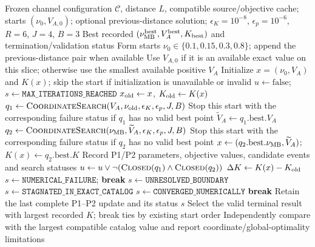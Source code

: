 \begin{algorithm}[t]
\caption{Exact-source alternating optimization with explicit search status}
\label{alg:ao}
\small
\begin{algorithmic}[1]
\Require Frozen channel configuration $\mathcal C$, distance $L$, compatible
source/objective cache; starts $(\nu_0,V_{A,0})$; optional previous-distance
solution; $\epsilon_K=10^{-8}$, $\epsilon_p=10^{-6}$,
$R=6$, $J=4$, $B=3$
\Ensure Best recorded $(\nu_{\rm MB}^{\rm best},V_A^{\rm best},K_{\rm best})$
and termination/validation status
\State Form starts $\nu_0\in\{0.1,0.15,0.3,0.8\}$; append the previous-distance pair when available
  \State Use $V_{A,0}$ if it is an available exact value on this slice; otherwise use the smallest available positive $V_A$
  \State Initialize $x=(\nu_0,V_A)$ and $K(x)$; skip the start if initialization is unavailable or invalid
  \State $u\gets\mathrm{false}$; $s\gets\texttt{MAX\_ITERATIONS\_REACHED}$
    \State $x_{\rm old}\gets x$, $K_{\rm old}\gets K(x)$
    \State $q_1\gets\Call{CoordinateSearch}{V_A,\nu_{\rm old},\epsilon_K,\epsilon_p,J,B}$
    \State Stop this start with the corresponding failure status if $q_1$ has no valid best point
    \State $\widetilde V_A\gets q_1.\mathrm{best}.V_A$ 
    \State $q_2\gets\Call{CoordinateSearch}{\nu_{\rm MB},\widetilde V_A,\epsilon_K,\epsilon_p,J,B}$
    \State Stop this start with the corresponding failure status if $q_2$ has no valid best point
    \State $x\gets(q_2.\mathrm{best}.\nu_{\rm MB},\widetilde V_A)$; $K(x)\gets q_2.\mathrm{best}.K$
    \State Record P1/P2 parameters, objective values, candidate events and search statuses
    \State $u\gets u\lor\neg(\Call{Closed}{q_1}\land\Call{Closed}{q_2})$
    \State $\Delta K\gets K(x)-K_{\rm old}$
      \State $s\gets\texttt{NUMERICAL\_FAILURE}$; \textbf{break}
        \State $s\gets\texttt{UNRESOLVED\_BOUNDARY}$
        \State $s\gets\texttt{STAGNATED\_IN\_EXACT\_CATALOG}$
      \Else
        \State $s\gets\texttt{CONVERGED\_NUMERICALLY}$
      \EndIf
      \State \textbf{break}
    \EndIf
  \EndFor
  \State Retain the last complete P1--P2 update and its status $s$
\EndFor
\State Select the valid terminal result with largest recorded $K$; break ties by existing start order
\State Independently compare with the largest compatible catalog value and report coordinate/global-optimality limitations
\end{algorithmic}
\end{algorithm}

